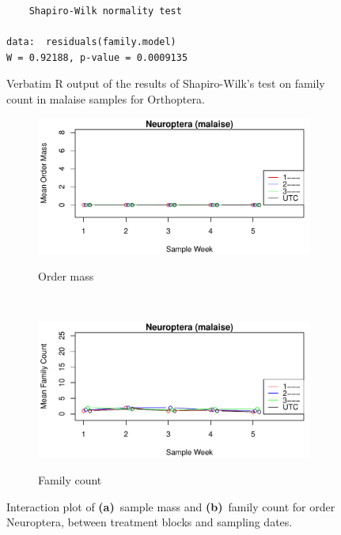 \documentclass[10pt,letterpaper,twocolumn]{article}
\begin{document}
\begin{figure}[h]
	\lstset{numbers=left}
	\lstset{xleftmargin=5mm,framexleftmargin=5mm}
	\begin{lstlisting}
	Shapiro-Wilk normality test

data:  residuals(family.model)
W = 0.92188, p-value = 0.0009135
	\end{lstlisting}
	\caption{Verbatim R output of the results of Shapiro-Wilk's test on family count in malaise samples for Orthoptera.}
	\label{fig:malaise_orthoptera_family_shapiro}
	\smallskip
	\nointerlineskip
	\hrulefill
\end{figure}

\begin{figure}[h]
	\centering
	\begin{subfigure}[b]{0.45\textwidth}
		\caption{Order mass}
		\includegraphics[width=\textwidth]{plots/blocks/interaction/mass/mass_malaise_Neuroptera_interplot.pdf}
		\label{fig:malaise_neuroptera_mass_interplot}
	\end{subfigure}
	~
	\begin{subfigure}[b]{0.45\textwidth}
		\caption{Family count}
		\includegraphics[width=\textwidth]{plots/blocks/interaction/family/family_malaise_Neuroptera_interplot.pdf}
		\label{fig:malaise_neuroptera_family_interplot}
	\end{subfigure}
	\caption{Interaction plot of \textbf{(a)}~sample mass and \textbf{(b)}~family count for order Neuroptera, between treatment blocks and sampling dates.}
	\label{fig:malaise_neuroptera_interplot}
	\smallskip
	\nointerlineskip
	\hrulefill
\end{figure}
\end{document}
